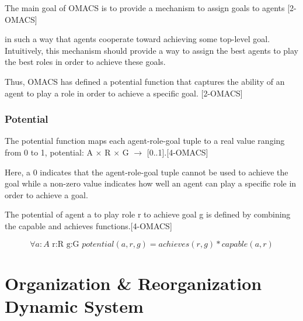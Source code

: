 \pagebreak


The main goal of OMACS is to provide a mechanism to assign goals to agents [2-OMACS]

in such a way that agents cooperate toward achieving some top-level goal.
Intuitively, this mechanism should provide a way to assign the best agents 
to play the best roles in order to achieve these goals. 

Thus, OMACS has defined  a potential function that captures the ability of an agent 
to play a role in order  to achieve a specific goal.   [2-OMACS]


\subsubsection{Potential}
The potential function maps each agent-role-goal tuple to a real value ranging from 0 to 1, 
potential: A $\times$ R $\times$ G $\rightarrow$ [0..1].[4-OMACS]

Here, a 0 indicates that the agent-role-goal tuple cannot be
used to achieve the goal while a non-zero value indicates how well an agent can play
a specific role in order to achieve a goal.  

The potential of agent a to play role r 
to achieve goal g is defined by combining the capable and achieves functions.[4-OMACS]

\begin{equation}
\forall a:A\textrm{ r:R g:G }potential(a,r,g)=achieves(r,g)*capable(a,r)\label{eq:potentialFunc}
\end{equation}







































\section{ Organization \& Reorganization Dynamic System}
 
